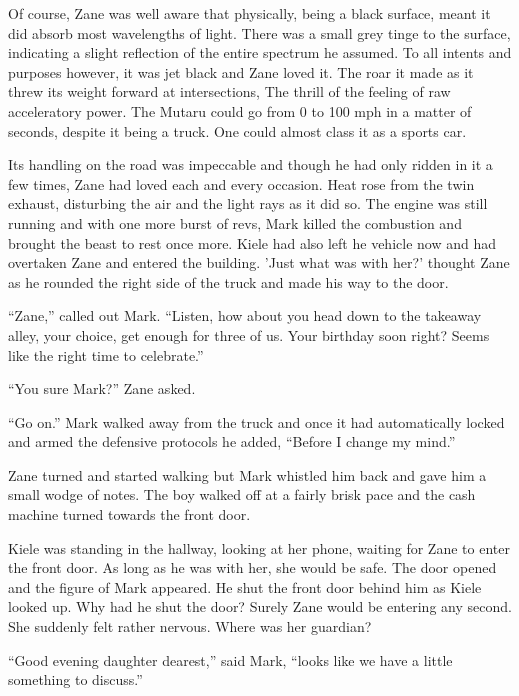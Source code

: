 Of course, Zane was well aware that physically, being a black surface, meant it did absorb most wavelengths of light.  There was a small grey tinge to the surface, indicating a slight reflection of the entire spectrum he assumed.  To all intents and purposes however, it was jet black and Zane loved it.  The roar it made as it threw its weight forward at intersections, The thrill of the feeling of raw acceleratory power.  The Mutaru could go from 0 to 100 mph in a matter of seconds, despite it being a truck.  One could almost class it as a sports car.

Its handling on the road was impeccable and though he had only ridden in it a few times, Zane had loved each and every occasion.  Heat rose from the twin exhaust, disturbing the air and the light rays as it did so.  The engine was still running and with one more burst of revs, Mark killed the combustion and brought the beast to rest once more.  Kiele had also left he vehicle now and had overtaken Zane and entered the building.  'Just what was with her?' thought Zane as he rounded the right side of the truck and made his way to the door.

``Zane,'' called out Mark.  ``Listen, how about you head down to the takeaway alley, your choice, get enough for three of us.  Your birthday soon right?  Seems like the right time to celebrate.''

``You sure Mark?'' Zane asked.

``Go on.'' Mark walked away from the truck and once it had automatically locked and armed the defensive protocols he added, ``Before I change my mind.''

Zane turned and started walking but Mark whistled him back and gave him a small wodge of notes.  The boy walked off at a fairly brisk pace and the cash machine turned towards the front door.

Kiele was standing in the hallway, looking at her phone, waiting for Zane to enter the front door.  As long as he was with her, she would be safe.  The door opened and the figure of Mark appeared.  He shut the front door behind him as Kiele looked up.  Why had he shut the door?  Surely Zane would be entering any second.  She suddenly felt rather nervous.  Where was her guardian?  

``Good evening daughter dearest,'' said Mark, ``looks like we have a little something to discuss.''  



